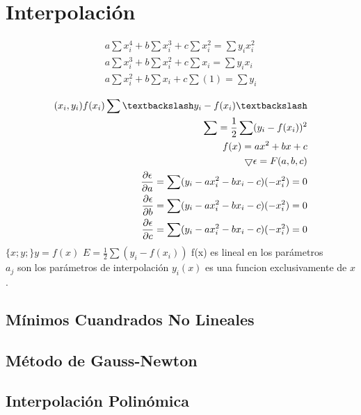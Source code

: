\chapter{Interpolaci\'on}
\begin{eqnarray}
a\sum x_i^4 + b\sum x_i^3 + c\sum x_i^2 = \sum y_ix_i^2 \\
a\sum x_i^3 + b\sum x_i^2 + c\sum x_i = \sum y_ix_i\\ 
a\sum x_i^2 + b\sum x_i + c\sum(1) = \sum y_i
\end{eqnarray}

\begin{eqnarray}
(x_i , y_i) f(x_i) \sum \textbackslash y_i-f(x_i) \textbackslash \\
\sum = \frac{1}{2}\sum(y_i-f(x_i))^2\\
f(x) = ax^2+bx+c \\
\bigtriangledown \epsilon = F(a, b, c) \\
\frac{ \partial \epsilon}{\partial a} = \sum(y_i - ax_i^2 - bx_i - c)(-x_i^2) = 0\\
\frac{\partial \epsilon}{\partial b} = \sum(y_i - ax_i^2 - bx_i - c)(-x_i^2) = 0 \\
\frac{\partial \epsilon}{\partial c} = \sum(y_i - ax_i^2 - bx_i - c)(-x_i^2) = 0
\end{eqnarray} 
$\{x; y;\} y = f(x)$
$E=\frac{1}{2}\sum(y_i-f(x_i))$%
f(x) es lineal en los par\'ametros\\
$a_j$ son los par\'ametros de interpolaci\'on
$y_i(x)$ es una funcion exclusivamente de $x$.


\section{M\'inimos Cuandrados No Lineales}

\section{M\'etodo de Gauss-Newton}

\section{Interpolaci\'on Polin\'omica}
